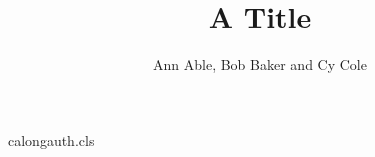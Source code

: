 \begin{filecontents*}[overwrite]{calongauth.cls}
\newif\if@longauth
\def\institute#1{\gdef\@institute{{\itshape{#1}}}}
\def\institutename{\par
 \begingroup
 \parindent=0pt
 \parskip=0pt
 \setcounter{@inst}{1}%
 \def\and{\vskip .05cm\par\stepcounter{@inst}%
          \noindent
          \hbox{$^{\the@inst}$\enspace}\ignorespaces}%
 \noindent\hbox{$^{1}$\enspace}\ignorespaces
 \@institute\par
 \endgroup}
\def\inst#1{\unskip$^{#1}$}
\def\@maketitle{\newpage\noindent{\Large\@title\par}\vskip6pt
  {\large\noindent\ignorespaces\@author\par}\vskip6pt
  \institutename}
\renewenvironment{thebibliography}[1]{\section*{References}\list{}{}}%
 {\endlist\if@longauth\kern6pt\hrule\kern6pt\institutename\@longauthfalse\fi}
\end{filecontents*}
\documentclass{calongauth}

\title{A Title}
\author{Ann Able, Bob Baker and Cy Cole}
\maketitle
Text.


